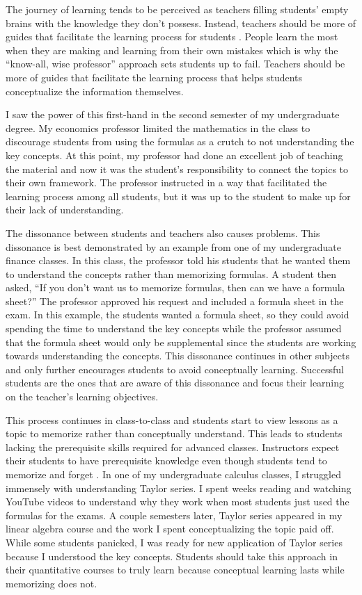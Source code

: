 \documentclass[11pt,]{article}
\begin{document}
The journey of learning tends to be perceived as teachers filling
students' empty brains with the knowledge they don't possess. Instead,
teachers should be more of guides that facilitate the learning process
for students \citet{bilgin2009}. People learn the most when they are
making and learning from their own mistakes which is why the ``know-all,
wise professor'' approach sets students up to fail. Teachers should be
more of guides that facilitate the learning process that helps students
conceptualize the information themselves.

I saw the power of this first-hand in the second semester of my
undergraduate degree. My economics professor limited the mathematics in
the class to discourage students from using the formulas as a crutch to
not understanding the key concepts. At this point, my professor had done
an excellent job of teaching the material and now it was the student's
responsibility to connect the topics to their own framework. The
professor instructed in a way that facilitated the learning process
among all students, but it was up to the student to make up for their
lack of understanding.

The dissonance between students and teachers also causes problems. This
dissonance is best demonstrated by an example from one of my
undergraduate finance classes. In this class, the professor told his
students that he wanted them to understand the concepts rather than
memorizing formulas. A student then asked, ``If you don't want us to
memorize formulas, then can we have a formula sheet?'' The professor
approved his request and included a formula sheet in the exam. In this
example, the students wanted a formula sheet, so they could avoid
spending the time to understand the key concepts while the professor
assumed that the formula sheet would only be supplemental since the
students are working towards understanding the concepts. This dissonance
continues in other subjects and only further encourages students to
avoid conceptually learning. Successful students are the ones that are
aware of this dissonance and focus their learning on the teacher's
learning objectives.

This process continues in class-to-class and students start to view
lessons as a topic to memorize rather than conceptually understand. This
leads to students lacking the prerequisite skills required for advanced
classes. Instructors expect their students to have prerequisite
knowledge even though students tend to memorize and forget
\citet{kennedy1998}. In one of my undergraduate calculus classes, I
struggled immensely with understanding Taylor series. I spent weeks
reading and watching YouTube videos to understand why they work when
most students just used the formulas for the exams. A couple semesters
later, Taylor series appeared in my linear algebra course and the work I
spent conceptualizing the topic paid off. While some students panicked,
I was ready for new application of Taylor series because I understood
the key concepts. Students should take this approach in their
quantitative courses to truly learn because conceptual learning lasts
while memorizing does not.
\end{document}
